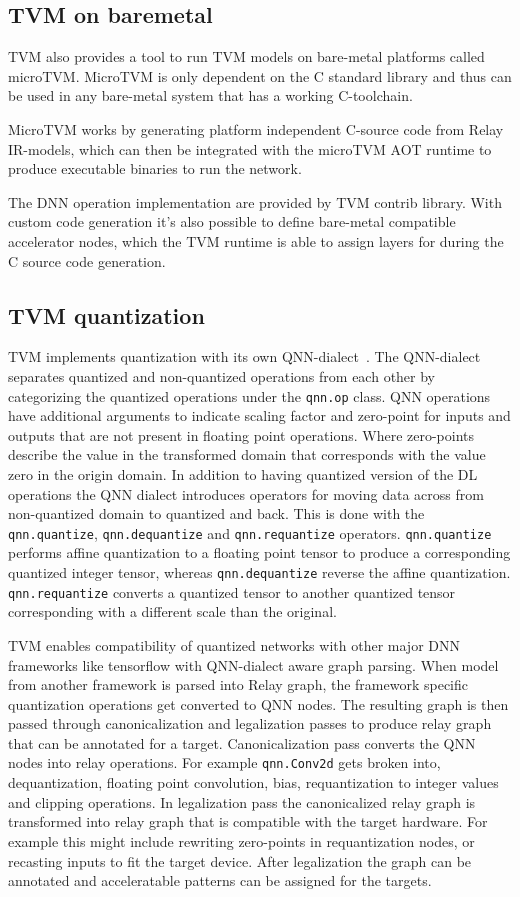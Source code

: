 \documentclass[12pt,a4paper,english
]{tunithesis}
\begin{document}
\subsection{TVM on baremetal}
TVM also provides a tool to run TVM models on bare-metal platforms called microTVM. MicroTVM is only dependent on the C standard library and thus can be used in any bare-metal system that has a working C-toolchain.

MicroTVM works by generating platform independent C-source code from Relay IR-models, which can then be integrated with the microTVM AOT runtime to produce executable binaries to run the network.

The DNN operation implementation are provided by TVM contrib library.
With custom code generation it's also possible to define bare-metal compatible accelerator nodes, which the TVM runtime is able to assign layers for during the C source code generation.~\parencite{TVM}

\subsection{TVM quantization}
TVM implements quantization with its own QNN-dialect~\cite{jain_efficient_2020}. The QNN-dialect separates quantized and non-quantized operations from each other by categorizing the quantized operations under the \texttt{qnn.op} class. QNN operations have additional arguments to indicate scaling factor and zero-point for inputs and outputs that are not present in floating point operations.
Where zero-points describe the value in the transformed domain that corresponds with the value zero in the origin domain. In addition to having quantized version of the DL operations the QNN dialect introduces operators for moving data across from non-quantized domain to quantized and back. This is done with the \texttt{qnn.quantize}, \texttt{qnn.dequantize} and \texttt{qnn.requantize} operators. \texttt{qnn.quantize} performs affine quantization to a floating point tensor to produce a corresponding quantized integer tensor, whereas \texttt{qnn.dequantize} reverse the affine quantization. \texttt{qnn.requantize} converts a quantized tensor to another quantized tensor corresponding with a different scale than the original.

TVM enables compatibility of quantized networks with other major DNN frameworks like tensorflow with QNN-dialect aware graph parsing. When model from another framework is parsed into Relay graph, the framework specific quantization operations get converted to QNN nodes. The resulting graph is then passed through canonicalization and legalization passes to produce relay graph that can be annotated for a target.
Canonicalization pass converts the QNN nodes into relay operations. For example \texttt{qnn.Conv2d} gets broken into, dequantization, floating point convolution, bias, requantization to integer values and clipping operations.
In legalization pass the canonicalized relay graph is transformed into relay graph that is compatible with the target hardware. For example this might include rewriting zero-points in requantization nodes, or recasting inputs to fit the target device.
After legalization the graph can be annotated and acceleratable patterns can be assigned for the targets.
\end{document}
